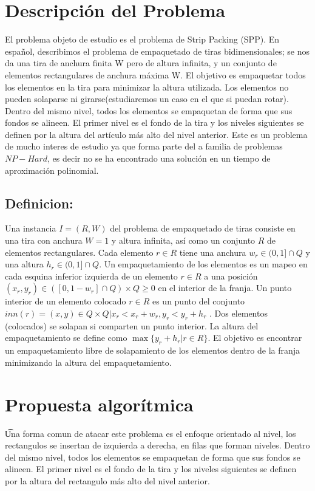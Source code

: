 \documentclass[10pt]{article}
\begin{document}
\section{Descripción del Problema}
El problema objeto de estudio es el problema de Strip Packing (SPP). En español, describimos el problema de empaquetado de tiras bidimensionales; se nos da una tira de anchura finita W pero de altura infinita, y un conjunto de elementos rectangulares de anchura máxima W. El objetivo es empaquetar todos los elementos en la tira para minimizar la altura utilizada. Los elementos no pueden solaparse ni girarse(estudiaremos un caso en el que si puedan rotar). 
Dentro del mismo nivel, todos los elementos se empaquetan de forma que sus fondos se alineen. El primer nivel es el fondo de la tira y los niveles siguientes se definen por la altura del artículo más alto del nivel anterior.
Este es un problema de mucho interes de estudio ya que forma parte del a familia de problemas $NP-Hard$, es decir no se ha encontrado una solución en un tiempo de aproximación polinomial.

\subsection{Definicion:}
Una instancia $ I = (R,W)$  del problema de empaquetado de tiras consiste en una tira con anchura $W = 1$ y altura infinita, así como un conjunto $R$  de elementos rectangulares. Cada elemento $r   \in   R$ tiene una anchura  $w_r \in  (0,1]  \cap  Q $ y una altura  $h_r     \in   (0,1] \cap Q $. Un empaquetamiento de los elementos es un mapeo en cada esquina inferior izquierda de un elemento $r    \in   R$  a una posición $(x_r,y_r) \in([0,1 - w_r] \cap Q) \times Q\geq 0$ en el interior de la franja. 
Un punto interior de un elemento colocado $ r \in  R $ es un punto del conjunto $inn(r)={(x,y) \in Q\times Q | x_r < x_r + w_r , y_r<y_r+h_r}$ .
Dos elementos (colocados) se solapan si comparten un punto interior. La altura del empaquetamiento se define como $ \max \{ y_r + h_r | r \in R\} $. El objetivo es encontrar un empaquetamiento libre de solapamiento de los elementos dentro de la franja minimizando la altura del empaquetamiento.

\section{Propuesta algorítmica} %

\t Una forma comun de atacar este problema es el enfoque orientado al nivel, los rectangulos se insertan de izquierda a derecha, en filas que forman niveles. Dentro del mismo nivel, todos los elementos se empaquetan de forma que sus fondos se alineen. El primer nivel es el fondo de la tira y los niveles siguientes se definen por la altura del rectangulo más alto del nivel anterior.
 
\end{document}
